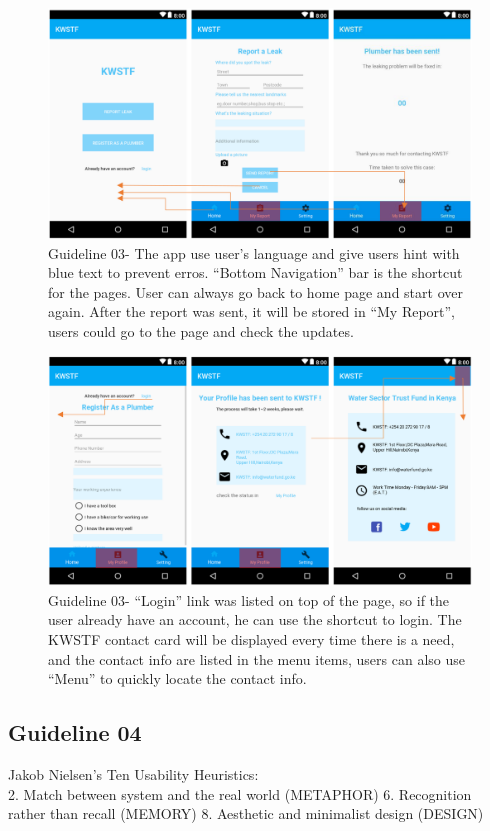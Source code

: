 \documentclass{article}
\begin{document}
\begin{figure}[H]
\centering
\includegraphics[width=15cm]{files/figures/fig1_guide3.png}
\caption{Guideline 03- The app use user’s language and give users hint with blue text to prevent erros. “Bottom Navigation” bar is the shortcut for the
pages. User can always go back to home page and start over again. After the report was sent, it will be stored in “My Report”,
users could go to the page and check the updates.}
\end{figure}

\begin{figure}[H]
\centering
\includegraphics[width=15cm]{files/figures/fig2_guide3.png}
\caption{Guideline 03- “Login” link was listed on top of the page, so if the user already have an account, he can use the shortcut to login. The
KWSTF contact card will be displayed every time there is a need, and the contact info are listed in the menu items, users
can also use “Menu” to quickly locate the contact info.}

\end{figure} 

\subsection{Guideline 04}
Jakob Nielsen’s Ten Usability Heuristics:\\
2. Match between system and the real world (METAPHOR) 6. Recognition rather than recall (MEMORY) 8. Aesthetic and minimalist design (DESIGN)
\end{document}
